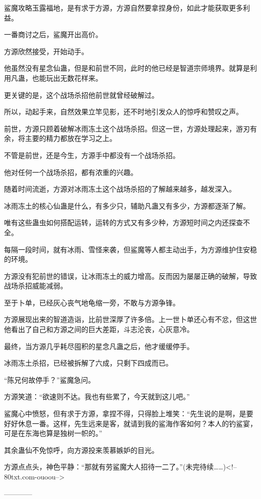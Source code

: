 \begin{this_body}
鲨魔攻略玉露福地，是有求于方源，方源自然要拿捏身份，如此才能获取更多利益。

一番商讨之后，鲨魔开出高价。

方源欣然接受，开始动手。

他虽然没有星念仙蛊，但是和前世不同，此时的他已经是智道宗师境界。就算是利用凡蛊，也能玩出无数花样来。

更关键的是，这个战场杀招他前世就曾经破解过。

所以，动起手来，自然效果立竿见影，还不时地引发众人的惊呼和赞叹之声。

前世，方源只顾着破解冰雨冻土这个战场杀招。但这一世，方源处理起来，游刃有余，将主要的精力都放在学习之上。

不管是前世，还是今生，方源手中都没有一个战场杀招。

他对任何一个战场杀招，都有浓重的兴趣。

随着时间流逝，方源对冰雨冻土这个战场杀招的了解越来越多，越发深入。

冰雨冻土的核心仙蛊是什么，有多少只，辅助凡蛊又有多少，方源都逐渐了解。

唯有这些蛊虫如何搭配运转，运转的方式又有多少种，方源短时间之内还探查不全。

每隔一段时间，就有冰雨、雪怪来袭，但鲨魔等人都主动出手，为方源维护住安稳的环境。

方源没有犯前世的错误，让冰雨冻土的威力增高。反而因为屡屡正确的破解，导致战场杀招威能减弱。

至于卜单，已经灰心丧气地龟缩一旁，不敢与方源争锋。

方源展现出来的智道造诣，比前世深厚了许多倍。上一世卜单还心有不忿，但这世他看出了自己和方源之间的巨大差距，斗志沦丧，心灰意冷。

最终，当方源几乎耗尽囤积的星念凡蛊之后，他才缓缓停手。

冰雨冻土杀招，已经被拆解了六成，只剩下四成而已。

“陈兄何故停手？”鲨魔急问。

方源笑道：“欲速则不达。我也有些累了，今天就到这儿吧。”

鲨魔心中愤怒，但有求于方源，拿捏不得，只得脸上堆笑：“先生说的是啊，是要好好休息一番。这样，先生远来是客，就请到我的鲨海作客如何？本人的钓鲨宴，可是在东海也算是独树一帜的。”

其余蛊仙不免惊呼，向方源投来羡慕嫉妒的目光。

方源点点头，神色平静：“那就有劳鲨魔大人招待一二了。”(未完待续……)<!--80txt.com-ouoou-->

------------

\end{this_body}

